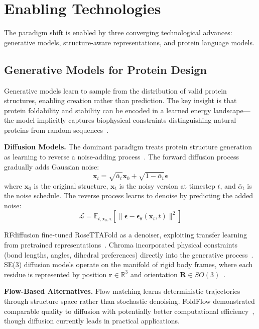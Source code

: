 \section{Enabling Technologies}
\label{sec:technologies}

The paradigm shift is enabled by three converging technological advances: generative models, structure-aware representations, and protein language models.

\subsection{Generative Models for Protein Design}

Generative models learn to sample from the distribution of valid protein structures, enabling creation rather than prediction. The key insight is that protein foldability and stability can be encoded in a learned energy landscape---the model implicitly captures biophysical constraints distinguishing natural proteins from random sequences~\cite{ho2020denoising}.

\textbf{Diffusion Models.} The dominant paradigm treats protein structure generation as learning to reverse a noise-adding process~\cite{ho2020denoising}. The forward diffusion process gradually adds Gaussian noise:
$$\mathbf{x}_t = \sqrt{\bar{\alpha}_t}\mathbf{x}_0 + \sqrt{1-\bar{\alpha}_t}\boldsymbol{\epsilon}$$
where $\mathbf{x}_0$ is the original structure, $\mathbf{x}_t$ is the noisy version at timestep $t$, and $\bar{\alpha}_t$ is the noise schedule. The reverse process learns to denoise by predicting the added noise:
$$\mathcal{L} = \mathbb{E}_{t,\mathbf{x}_0,\boldsymbol{\epsilon}}\left[\|\boldsymbol{\epsilon} - \boldsymbol{\epsilon}_\theta(\mathbf{x}_t, t)\|^2\right]$$

RFdiffusion fine-tuned RoseTTAFold as a denoiser, exploiting transfer learning from pretrained representations~\cite{watson2023rfdiffusion}. Chroma incorporated physical constraints (bond lengths, angles, dihedral preferences) directly into the generative process~\cite{ingraham2023chroma}. SE(3) diffusion models operate on the manifold of rigid body frames, where each residue is represented by position $\mathbf{r} \in \mathbb{R}^3$ and orientation $\mathbf{R} \in SO(3)$~\cite{yim2023se3diffusion}.

\textbf{Flow-Based Alternatives.} Flow matching learns deterministic trajectories through structure space rather than stochastic denoising. FoldFlow demonstrated comparable quality to diffusion with potentially better computational efficiency~\cite{bose2023foldflow}, though diffusion currently leads in practical applications.

